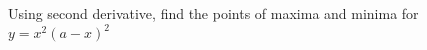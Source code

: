 
%
%
%
%
% 
% 

\question[3] Using second derivative, find the points of maxima and minima for $y=x^2(a-x)^2$


\ifprintanswers
\fi 

